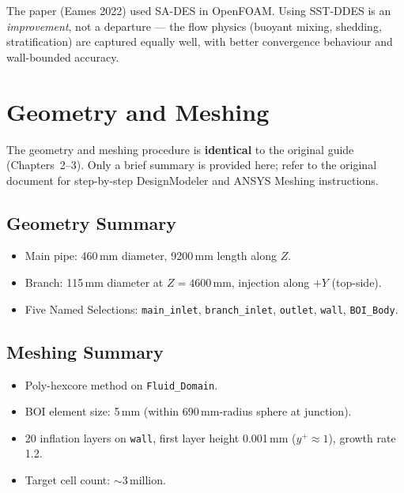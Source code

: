 \documentclass[12pt,a4paper]{report}
\begin{document}
\noindent The paper (Eames 2022) used SA-DES in OpenFOAM.  Using
SST-DDES is an \emph{improvement}, not a departure --- the flow
physics (buoyant mixing, shedding, stratification) are captured
equally well, with better convergence behaviour and wall-bounded
accuracy.


\chapter{Geometry and Meshing}
\label{ch:mesh}

The geometry and meshing procedure is \textbf{identical} to the
original guide (Chapters~2--3).  Only a brief summary is provided
here; refer to the original document for step-by-step DesignModeler
and ANSYS Meshing instructions.

\section{Geometry Summary}

\begin{itemize}
  \item Main pipe: 460\,mm diameter, 9200\,mm length along $Z$.
  \item Branch: 115\,mm diameter at $Z = 4600$\,mm, injection
        along $+Y$ (top-side).
  \item Five Named Selections: \texttt{main\_inlet},
        \texttt{branch\_inlet}, \texttt{outlet}, \texttt{wall},
        \texttt{BOI\_Body}.
\end{itemize}

\section{Meshing Summary}

\begin{itemize}
  \item Poly-hexcore method on \texttt{Fluid\_Domain}.
  \item BOI element size: 5\,mm (within 690\,mm-radius sphere at
        junction).
  \item 20 inflation layers on \texttt{wall}, first layer
        height 0.001\,mm ($y^+ \approx 1$), growth rate 1.2.
  \item Target cell count: $\sim$3\,million.
\end{itemize}
\end{document}
